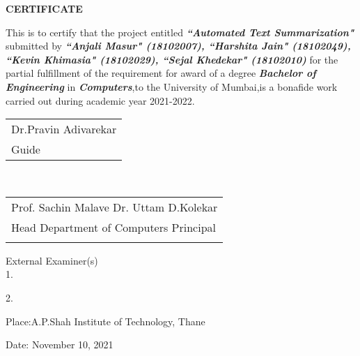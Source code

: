 \newpage
\thispagestyle{empty}
\vspace*{0.2cm}
\vspace{1cm}
\begin{center}
 \large\textbf{CERTIFICATE}
\end{center}
\vspace{1cm}

\par This is to certify that the project entitled \textbf{\textit{``Automated Text Summarization"}} submitted by \textbf{\textit{``Anjali Masur" (18102007), ``Harshita Jain" (18102049), ``Kevin Khimasia" (18102029), ``Sejal Khedekar" (18102010)}}  for the partial fulfillment of the requirement for award of a degree \textbf{\textit{Bachelor of Engineering} }in\textbf{ \textit{Computers}},to the University of Mumbai,is a bonafide work carried out during academic year 2021-2022.\\

\vspace{25mm}
\begin{tabular}{@{}l@{}}
\hspace{115mm}       Dr.Pravin Adivarekar\\
\hspace{130mm}    Guide\\

\end{tabular}
\vspace{30mm}\\
\hfill
\begin{tabular}{@{}l@{}}
\hspace{13mm} Prof. Sachin Malave\hspace{73mm}       Dr. Uttam D.Kolekar\\
\hspace{5mm}Head Department of Computers \hspace{67mm} Principal\\
\vspace{5mm}
\end{tabular}

\vspace{20mm}
External Examiner(s)\\

1. \\
\vspace{10mm}

2. \\
\vspace{10mm}

Place:A.P.Shah Institute of Technology, Thane\par
\vspace{1mm}

Date: November 10, 2021
\clearpage

\vspace{5mm}

